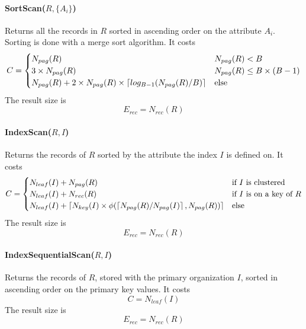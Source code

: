 \paragraph{SortScan($R, \{A_i\}$)}
Returns all the records in $R$ sorted in ascending order on the attribute $A_i$. Sorting is done with a merge sort algorithm. It costs
\begin{equation*}
    C = \begin{cases}
        N_{pag}(R) & N_{pag}(R) < B \\
        3 \times N_{pag}(R) & N_{pag}(R) \leq B \times (B-1) \\
        N_{pag}(R) + 2 \times N_{pag}(R) \times \left\lceil log_{B-1}(N_{pag}(R) / B)\right\rceil & \text{else}
    \end{cases}
\end{equation*}
The result size is
\begin{equation*}
    E_{rec} = N_{rec}(R)
\end{equation*}

\paragraph{IndexScan($R, I$)}
Returns the records of $R$ sorted by the attribute the index $I$ is defined on. It costs
\begin{equation*}
    C = \begin{cases}
        N_{leaf}(I) + N_{pag}(R) & \text{if $I$ is clustered} \\
        N_{leaf}(I) + N_{rec}(R) & \text{if $I$ is on a key of $R$} \\
        N_{leaf}(I) + \left\lceil N_{key}(I) \times \phi(\left\lceil N_{pag}(R) / N_{pag}(I)\right\rceil, N_{pag}(R))\right\rceil & \text{else}
    \end{cases}
\end{equation*}
The result size is
\begin{equation*}
    E_{rec} = N_{rec}(R)
\end{equation*}

\paragraph{IndexSequentialScan($R, I$)}
Returns the records of $R$, stored with the primary organization $I$, sorted in ascending order on the primary key values. It costs
\begin{equation}
    C = N_{leaf}(I)
\end{equation}
The result size is
\begin{equation*}
    E_{rec} = N_{rec}(R)
\end{equation*}

